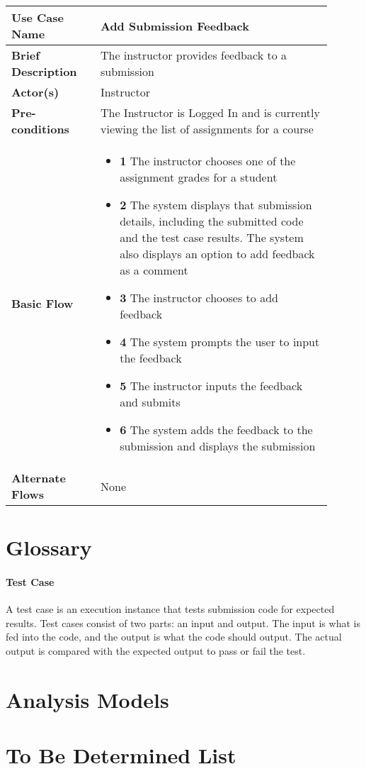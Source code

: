 \documentclass{article}
\begin{document}
\begin{tabular}{| p{0.25\linewidth} | p{0.65\linewidth} |}
  \hline
  \textbf{Use Case Name} & Add Submission Feedback \\
  \hline
  \textbf{Brief Description} & The instructor provides feedback to a submission \\
  \hline
  \textbf{Actor(s)} & Instructor \\
  \hline
  \textbf{Pre-conditions} & The Instructor is Logged In and is currently viewing the list of assignments for a course\\
  \hline
  \textbf{Basic Flow} & \begin{itemize}
    \item[] \textbf{1} The instructor chooses one of the assignment grades for a student
    \item[] \textbf{2} The system displays that submission details, including the submitted code and the test case results. The system also displays an option to add feedback as a comment
    \item[] \textbf{3} The instructor chooses to add feedback
    \item[] \textbf{4} The system prompts the user to input the feedback
    \item[] \textbf{5} The instructor inputs the feedback and submits
    \item[] \textbf{6} The system adds the feedback to the submission and displays the submission
  \end{itemize}\\
  \hline
  \textbf{Alternate Flows} & None\\
  \hline
\end{tabular}

\newpage
\appendix




\section{Glossary}

\paragraph{Test Case} A test case is an execution instance that tests submission code for expected results. Test cases consist of two parts: an input and output. The input is what is fed into the code, and the output is what the code should output. The actual output is compared with the expected output to pass or fail the test.


\newpage
\section{Analysis Models}


\newpage
\section{To Be Determined List}
\end{document}
